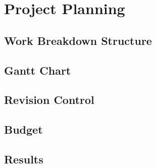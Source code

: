 \chapter{Project Planning}
\section{Work Breakdown Structure}
\section{Gantt Chart}
\section{Revision Control}
\section{Budget}
\section{Results}